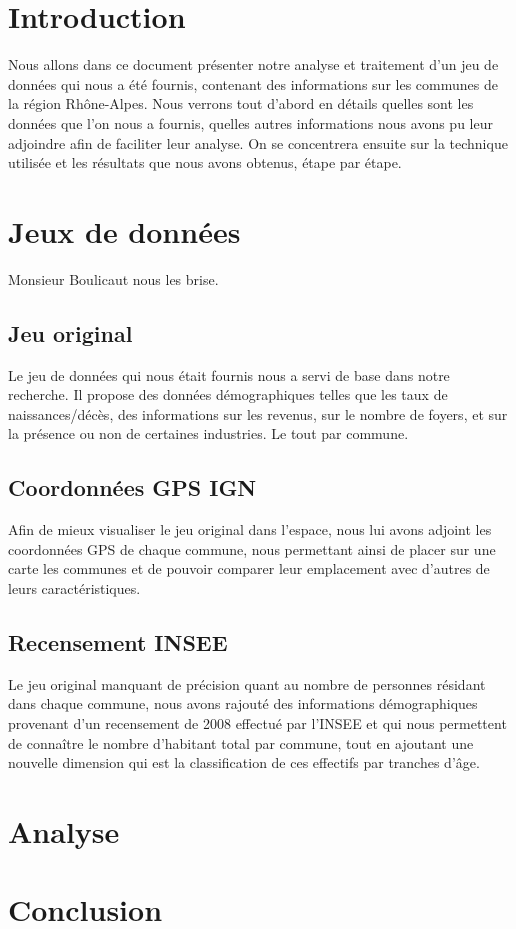 \section{Introduction}

Nous allons dans ce document présenter notre analyse et traitement d'un jeu de données qui nous a été fournis, contenant des informations sur les communes de la région Rhône-Alpes. Nous verrons tout d'abord en détails quelles sont les données que l'on nous a fournis, quelles autres informations nous avons pu leur adjoindre afin de faciliter leur analyse. On se concentrera ensuite sur la technique utilisée et les résultats que nous avons obtenus, étape par étape.

\section{Jeux de données}
Monsieur Boulicaut nous les brise.

\subsection{Jeu original}

Le jeu de données qui nous était fournis nous a servi de base dans notre recherche. Il propose des données démographiques telles que les taux de naissances/décès, des informations sur les revenus, sur le nombre de foyers, et sur la présence ou non de certaines industries. Le tout par commune.

\subsection{Coordonnées GPS IGN}

Afin de mieux visualiser le jeu original dans l'espace, nous lui avons adjoint les coordonnées GPS de chaque commune, nous permettant ainsi de placer sur une carte les communes et de pouvoir comparer leur emplacement avec d'autres de leurs caractéristiques.

\subsection{Recensement INSEE}

Le jeu original manquant de précision quant au nombre de personnes résidant dans chaque commune, nous avons rajouté des informations démographiques provenant d'un recensement de 2008 effectué par l'INSEE et qui nous permettent de connaître le nombre d'habitant total par commune, tout en ajoutant une nouvelle dimension qui est la classification de ces effectifs par tranches d'âge.

\section{Analyse}

\section{Conclusion}